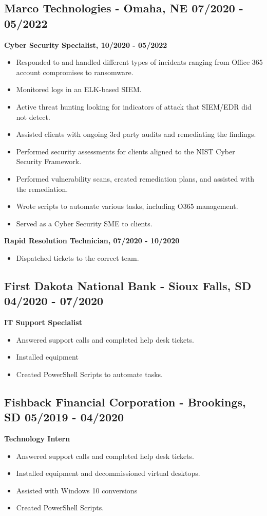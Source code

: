 \documentclass[a4paper,10pt]{article}
\begin{document}
\subsection*{Marco Technologies - Omaha, NE \hfill 07/2020 - 05/2022}
\textbf{Cyber Security Specialist, 10/2020 - 05/2022}
\begin{itemize}
    \item Responded to and handled different types of incidents ranging from Office 365 account compromises to ransomware.
    \item Monitored logs in an ELK-based SIEM.
    \item Active threat hunting looking for indicators of attack that SIEM/EDR did not detect.
    \item Assisted clients with ongoing 3rd party audits and remediating the findings.
    \item Performed security assessments for clients aligned to the NIST Cyber Security Framework.
    \item Performed vulnerability scans, created remediation plans, and assisted with the remediation.
    \item Wrote scripts to automate various tasks, including O365 management.
    \item Served as a Cyber Security SME to clients.
\end{itemize}
\textbf{Rapid Resolution Technician, 07/2020 - 10/2020}
\begin{itemize}
    \item Dispatched tickets to the correct team.
\end{itemize}

\subsection*{First Dakota National Bank - Sioux Falls, SD \hfill 04/2020 - 07/2020}
\textbf{IT Support Specialist}
\begin{itemize}
    \item Answered support calls and completed help desk tickets.
    \item Installed equipment
    \item Created PowerShell Scripts to automate tasks.
\end{itemize}
\subsection*{Fishback Financial Corporation - Brookings, SD \hfill 05/2019 - 04/2020}
\textbf{Technology Intern}
\begin{itemize}
    \item Answered support calls and completed help desk tickets.
    \item Installed equipment and decommissioned virtual desktops.
    \item Assisted with Windows 10 conversions
    \item Created PowerShell Scripts.
\end{itemize}
\end{document}
